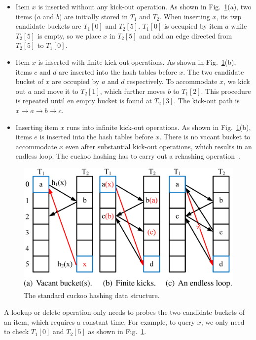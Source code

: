 \documentclass[12pt,conference,compsoc]{IEEEtran}
\begin{document}
\begin{itemize}
    \item Item $x$ is inserted without any kick-out operation. As shown in Fig.~\ref{fig:cuckoo-example}(a), two items ($a$ and $b$) are initially stored in $T_1$ and $T_2$. When inserting $x$, its twp candidate buckets are $T_1[0]$ and $T_2[5]$. $T_1[0]$ is occupied by item $a$ while $T_2[5]$ is empty, so we place $x$ in $T_2[5]$ and add an edge directed from $T_2[5]$ to $T_1[0]$.
    \item Item $x$ is inserted with finite kick-out operations. As shown in Fig.~\ref{fig:cuckoo-example}(b), items $c$ and $d$ are inserted into the hash tables before $x$. The two candidate bucket of $x$ are occupied by $a$ and $d$ respectively. To accommodate $x$, we kick out $a$ and move it to $T_2[1]$, which further moves $b$ to $T_1[2]$. This procedure is repeated until en empty bucket is found at $T_2[3]$. The kick-out path is $x\rightarrow a\rightarrow b\rightarrow c$.
    \item Inserting item $x$ runs into infinite kick-out operations. As shown in Fig.~\ref{fig:cuckoo-example}(b), items $e$ is inserted into the hash tables before $x$. There is no vacant bucket to accommodate $x$ even after substantial kick-out operations, which results in an endless loop. The cuckoo hashing has to carry out a rehashing operation~\cite{cuckoo}.
\end{itemize}

\begin{figure}
    \centering
    \includegraphics[width=\linewidth]{fig1.png}
    \caption{The standard cuckoo hashing data structure.
    } \label{fig:cuckoo-example}
\end{figure}

A lookup or delete operation only needs to probes the two candidate buckets of an item, which requires a constant time. For example, to query $x$, we only need to check $T_1[0]$ and $T_2[5]$ as shown in Fig.~\ref{fig:cuckoo-example}.
\end{document}
